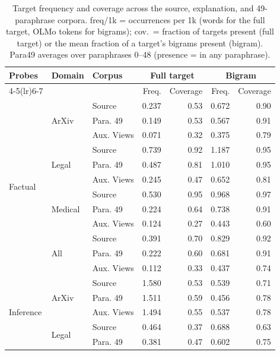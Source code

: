 \begin{table}[t]
\centering
\small
\caption{Target frequency and coverage across the source, explanation, and 49-paraphrase corpora. freq/1k = occurrences per 1k (words for the full target, OLMo tokens for bigrams); cov.\ = fraction of targets present (full target) or the mean fraction of a target's bigrams present (bigram). Para49 averages over paraphrases 0--48 (presence = in any paraphrase).}
\label{tab:target-occurrence}
\begin{tabular}{lllrrrr}
\toprule
Probes & Domain & Corpus & \multicolumn{2}{c}{Full target} & \multicolumn{2}{c}{Bigram} \\
\cmidrule(lr){4-5}\cmidrule(lr){6-7}
 & & & Freq. & Coverage & Freq. & Coverage \\
\midrule
\multirow{12}{*}{Factual} & \multirow{3}{*}{ArXiv} & Source & 0.237 & 0.53 & 0.672 & 0.90 \\
 &  & Para. 49 & 0.149 & 0.53 & 0.567 & 0.91 \\
 &  & Aux. Views & 0.071 & 0.32 & 0.375 & 0.79 \\
\cmidrule(lr){2-7}
 & \multirow{3}{*}{Legal} & Source & 0.739 & 0.92 & 1.187 & 0.95 \\
 &  & Para. 49 & 0.487 & 0.81 & 1.010 & 0.95 \\
 &  & Aux. Views & 0.245 & 0.47 & 0.652 & 0.81 \\
\cmidrule(lr){2-7}
 & \multirow{3}{*}{Medical} & Source & 0.530 & 0.95 & 0.968 & 0.97 \\
 &  & Para. 49 & 0.224 & 0.64 & 0.738 & 0.91 \\
 &  & Aux. Views & 0.124 & 0.27 & 0.443 & 0.60 \\
\cmidrule(lr){2-7}
 & \multirow{3}{*}{All} & Source & 0.391 & 0.70 & 0.829 & 0.92 \\
 &  & Para. 49 & 0.222 & 0.60 & 0.681 & 0.91 \\
 &  & Aux. Views & 0.112 & 0.33 & 0.437 & 0.74 \\
\midrule
\multirow{12}{*}{Inference} & \multirow{3}{*}{ArXiv} & Source & 1.580 & 0.53 & 0.539 & 0.71 \\
 &  & Para. 49 & 1.511 & 0.59 & 0.456 & 0.78 \\
 &  & Aux. Views & 1.494 & 0.55 & 0.537 & 0.78 \\
\cmidrule(lr){2-7}
 & \multirow{3}{*}{Legal} & Source & 0.464 & 0.37 & 0.688 & 0.63 \\
 &  & Para. 49 & 0.381 & 0.47 & 0.602 & 0.75 \\

\end{tabular}
\end{table}
